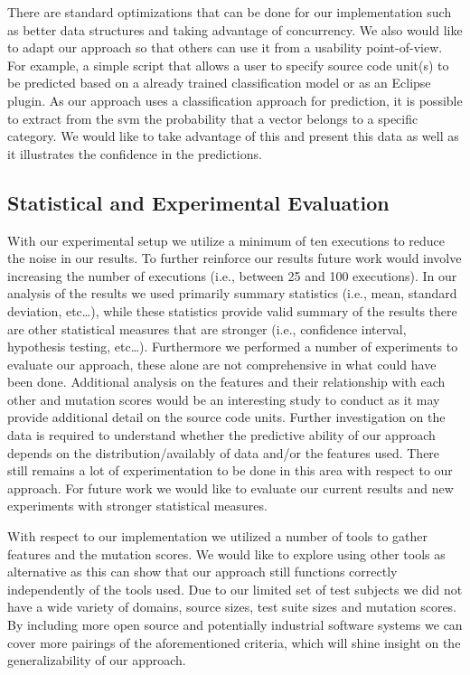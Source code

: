 There are standard optimizations that can be done for our implementation such as better data structures and taking advantage of concurrency. We also would like to adapt our approach so that others can use it from a usability point-of-view. For example, a simple script that allows a user to specify source code unit(s) to be predicted based on a already trained classification model or as an Eclipse plugin. As our approach uses a classification approach for prediction, it is possible to extract from the \gls{svm} the probability that a vector belongs to a specific category. We would like to take advantage of this and present this data as well as it illustrates the confidence in the predictions.


\subsection{Statistical and Experimental Evaluation}
\label{subsec:conclusions_experimental_evaluation}
With our experimental setup we utilize a minimum of ten executions to reduce the noise in our results. To further reinforce our results future work would involve increasing the number of executions (i.e., between 25 and 100 executions). In our analysis of the results we used primarily summary statistics (i.e., mean, standard deviation, etc\ldots), while these statistics provide valid summary of the results there are other statistical measures that are stronger (i.e., confidence interval, hypothesis testing, etc\ldots). Furthermore we performed a number of experiments to evaluate our approach, these alone are not comprehensive in what could have been done. Additional analysis on the features and their relationship with each other and mutation scores would be an interesting study to conduct as it may provide additional detail on the source code units. Further investigation on the data is required to understand whether the predictive ability of our approach depends on the distribution/availably of data and/or the features used. There still remains a lot of experimentation to be done in this area with respect to our approach. For future work we would like to evaluate our current results and new experiments with stronger statistical measures.

With respect to our implementation we utilized a number of tools to gather features and the mutation scores. We would like to explore using other tools as alternative as this can show that our approach still functions correctly independently of the tools used. Due to our limited set of test subjects we did not have a wide variety of domains, source sizes, test suite sizes and mutation scores. By including more open source and potentially industrial software systems we can cover more pairings of the aforementioned criteria, which will shine insight on the generalizability of our approach.


